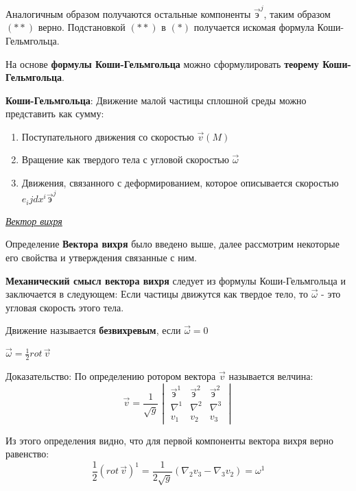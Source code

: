 Аналогичным образом получаются остальные компоненты $\vec{\text{э}}^j$, таким образом $(**)$ верно. Подстановкой $(**)$ в $(*)$ получается искомая формула Коши-Гельмгольца.

На основе \textbf{формулы Коши-Гельмгольца} можно сформулировать \textbf{теорему Коши-Гельмгольца}.

\theorem \textbf{Коши-Гельмгольца}: Движение малой частицы сплошной среды можно представить как сумму:
\begin{enumerate}
  \item Поступательного движения со скоростью $\vec{v}(M)$
  \item Вращение как твердого тела с угловой скоростью $\vec{\omega}$
  \item Движения, связанного с деформированием, которое описывается скоростью $e_ijdx^i \vec{\text{э}}^j$
\end{enumerate}

\begin{center}
  \textit{\underline{Вектор вихря}}
\end{center}

Определение \textbf{Вектора вихря} было введено выше, далее рассмотрим некоторые его свойства и утверждения связанные с ним.

\textbf{Механический смысл вектора вихря} следует из формулы Коши-Гельмгольца и заключается в следующем: Если частицы движутся как твердое тело, то $\vec{\omega}$ - это угловая скорость этого тела.

 Движение называется \textbf{безвихревым}, если $\vec{\omega} = 0$

\state $\vec{\omega} = \frac{1}{2}rot\, \vec{v}$

Доказательство: По определению ротором вектора $\vec{v}$ называется велчина:
\begin{equation*}
  \vec{v} = \frac{1}{\sqrt{g}}
  \begin{vmatrix}
    \vec{\text{э}}^1 & \vec{\text{э}}^2 & \vec{\text{э}}^2 \\
    \nabla^1         & \nabla^2         & \nabla^3         \\
    v_1              & v_2              & v_3
  \end{vmatrix}
\end{equation*}

Из этого определения видно, что для первой компоненты вектора вихря верно равенство:
$$
  \frac{1}{2}(rot\, \vec{v})^1 = \frac{1}{2 \sqrt{g}} (\nabla_2v_3 - \nabla_3 v_2) = \omega^1
$$

